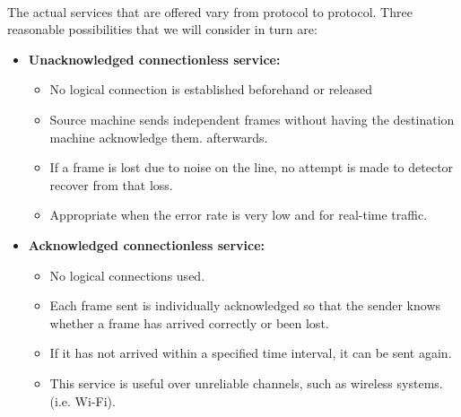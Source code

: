 \documentclass[../resumosRCOM.tex]{subfiles}
\begin{document}
\paragraph{}
The actual services that are offered vary from protocol to protocol. 
Three reasonable possibilities that we will consider in turn are:
\begin{itemize}
    \item \textbf{Unacknowledged connectionless service: }
    \begin{itemize}
        \item No logical connection is established beforehand or released
        \item Source machine sends independent frames without having 
        the destination machine acknowledge them. 
        afterwards.
        \item If a frame is lost due to noise on the line, no attempt 
        is made to detector recover from that loss.
        \item Appropriate when the error rate is very low and for 
        real-time traffic.
    \end{itemize}
    
    \item \textbf{Acknowledged connectionless service: }
    \begin{itemize}
        \item No logical connections used.
        \item Each frame sent is individually acknowledged so that the 
        sender knows whether a frame has arrived correctly or been lost.
        \item If it has not arrived within a specified time interval, 
        it can be sent again.
        \item This service is useful over unreliable channels, 
        such as wireless systems.(i.e. Wi-Fi).
    \end{itemize}
    

\end{itemize}
\end{document}
